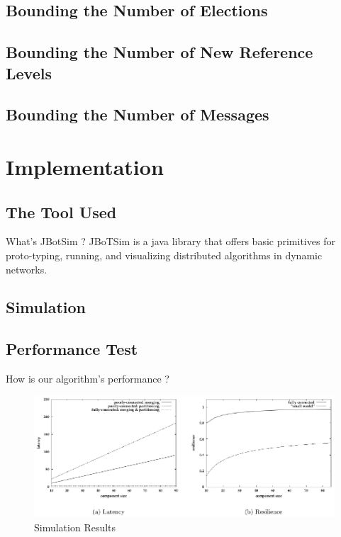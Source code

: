\documentclass{beamer}
\begin{document}
\subsection{Bounding the Number of Elections}

\subsection{Bounding the Number of New Reference Levels}

\subsection{Bounding the Number of Messages}

\section{Implementation}
\subsection{The Tool Used}

\begin{frame}{What's JBotSim ?}
JBoTSim is a java library that offers basic primitives for proto-typing, running, and visualizing distributed algorithms in dynamic networks.
\end{frame}

\subsection{Simulation}
\begin{frame}


\end{frame}

\subsection{Performance Test}
\begin{frame}{How is our algorithm's performance ?}
	\begin{figure}
		\centering
		\includegraphics[width=1\linewidth]{performance_test}
		\caption{Simulation Results}
		\label{fig:performancetest}
	\end{figure}
	
\end{frame}
\end{document}
